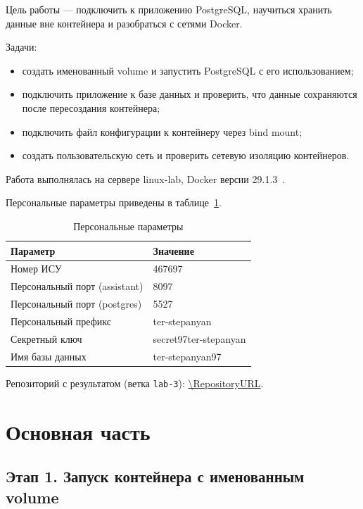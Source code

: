 
Цель работы --- подключить к приложению PostgreSQL, научиться хранить
данные вне контейнера и разобраться с сетями Docker.

Задачи:
\begin{itemize}
  \item создать именованный volume и запустить PostgreSQL с его использованием;
  \item подключить приложение к базе данных и проверить, что данные
        сохраняются после пересоздания контейнера;
  \item подключить файл конфигурации к контейнеру через bind mount;
  \item создать пользовательскую сеть и проверить сетевую изоляцию контейнеров.
\end{itemize}

Работа выполнялась на сервере linux-lab, Docker версии
29.1.3~\cite{docker-docs}.


Персональные параметры приведены в таблице~\ref{tab:parameters}.

\begin{table}[H]
  \caption{Персональные параметры}\label{tab:parameters}
  \centering
  \begin{tabularx}{\textwidth}{|p{}|X|}
    \hline
    Параметр & Значение\\ \hline
    Номер ИСУ & 467697\\ \hline
    Персональный порт (assistant) & 8097\\ \hline
    Персональный порт (postgres) & 5527\\ \hline
    Персональный префикс & ter-stepanyan\\ \hline
    Секретный ключ & secret97ter-stepanyan\\ \hline
    Имя базы данных & ter-stepanyan97\\ \hline
  \end{tabularx}
\end{table}

Репозиторий с результатом (ветка \texttt{lab-3}): \url{\RepositoryURL}.

\chapter{Основная часть}

\section{Этап 1. Запуск контейнера с именованным volume}

